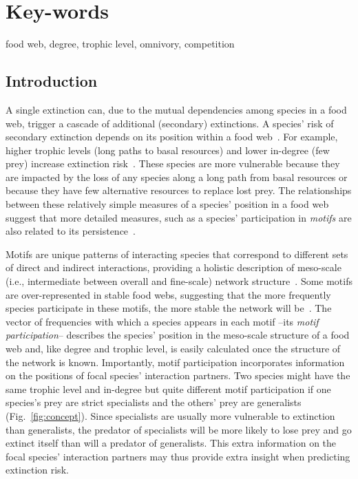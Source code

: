 \documentclass[12pt]{article}
\begin{document}
\section*{Key-words}
    food web, degree, trophic level, omnivory, competition

\clearpage
\begin{spacing}{2.0}
\linenumbers

\section*{Introduction} 

    A single extinction can, due to the mutual dependencies among species in a food web,  trigger a cascade of additional (secondary) extinctions. 
    A species' risk of secondary extinction depends on its position within a food web~\citep{Santos2021,dunne2009cascading, Eklof2006}.
    For example, higher trophic levels (long paths to basal resources) and lower in-degree (few prey) increase extinction risk~\citep{Allesina2012,binzer2011susceptibility,Eklof2006}.
    These species are more vulnerable because they are impacted by the loss of any species along a long path from basal resources or because they have few alternative resources to replace lost prey.
    The relationships between these relatively simple measures of a species' position in a food web suggest that more detailed measures, such as a species' participation in \emph{motifs} are also related to its persistence~\citep{Cirtwill2022Oikos}.
    
    
    Motifs are unique patterns of interacting species that correspond to different sets of direct and indirect interactions, providing a holistic description of meso-scale (i.e., intermediate between overall and fine-scale) network structure~\citep{Stouffer2007,Stouffer2012}.
    Some motifs are over-represented in stable food webs, suggesting that the more frequently species participate in these motifs, the more stable the network will be~\citep{Borrelli2015a}. 
    The vector of frequencies with which a species appears in each motif --its \emph{motif participation}-- describes the species' position in the meso-scale structure of a food web and, like degree and trophic level, is easily calculated once the structure of the network is known.
    Importantly, motif participation incorporates information on the positions of focal species' interaction partners.
    Two species might have the same trophic level and in-degree but quite different motif participation if one species's prey are strict specialists and the others' prey are generalists (Fig.~\ref{fig:concept}).
    Since specialists are usually more vulnerable to extinction than generalists, the predator of specialists will be more likely to lose prey and go extinct itself than will a predator of generalists.
    This extra information on the focal species' interaction partners may thus provide extra insight when predicting extinction risk.
    


\end{spacing}
\end{document}
